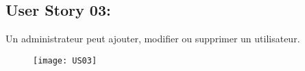 \newpage
\subsection{User Story 03:}
Un administrateur peut ajouter, modifier ou supprimer un utilisateur.

\begin{figure}[!h]
  \begin{center}
        \texttt{[image: US03]}
        \label{US03-dia}
  \end{center}
\end{figure}